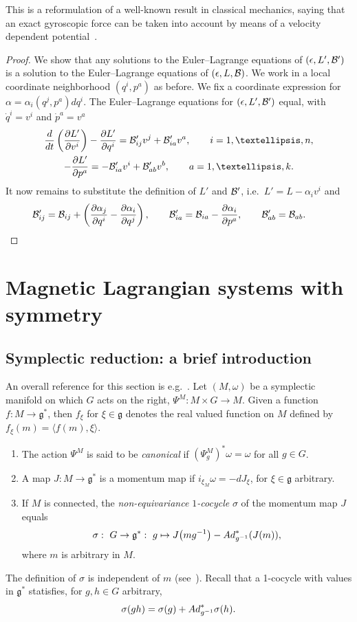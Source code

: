 \documentclass[11pt]{article}
\newcommand{\B}{{\cal B}}
\newcommand{\e}{\epsilon}
\newcommand{\lag}{\mathfrak{g}}
\def\fpd#1#2{\frac{\partial #1}{\partial #2}}
\begin{document}
This is a reformulation of a well-known result in classical mechanics, saying that an exact gyroscopic force can be taken into account by means of a velocity dependent potential~\cite{pars}.
\begin{proof}
We show that any solutions to the Euler--Lagrange equations of $(\e, L',\B ')$ is a solution to the Euler--Lagrange equations of $(\e,L,\B)$. We work in a local coordinate neighborhood $(q^i,p^a)$ as before. We f\/ix a coordinate expression for $\alpha=\alpha_i(q^j,p^a)dq^i$. The Euler--Lagrange equations for $(\e,L',\B')$ equal, with $\dot q^i= v^i$ and $\dot p^a= v^a$
\begin{gather*}
\frac{d}{dt}\left(\fpd{L'}{v^i}\right) -\fpd{L'}{q^i}=\B'_{ij}v^j + \B'_{ia} v^a,\qquad i=1,\ldots,n,\\
  -\fpd{L'}{p^a}=-\B'_{ia}v^i + \B'_{ab} v^b,\qquad a=1,\ldots,k.
\end{gather*}
It now remains to substitute the def\/inition of $L'$ and $\B'$, i.e.\ $L'= L - \alpha_i v^i$ and
\begin{gather*}
\B'_{ij} = \B_{ij} + \left(\fpd{\alpha_j}{q^i}-\fpd{\alpha_i}{q^j}\right), \qquad \B'_{ia} = \B_{ia} - \fpd{\alpha_i}{p^a}, \qquad \B'_{ab} = \B_{ab}. \tag*{\qed}
\end{gather*}
\renewcommand{\qed}{}\end{proof}


\section{Magnetic Lagrangian systems with symmetry}\label{section4}

\subsection{Symplectic reduction: a brief introduction}\label{section4.1}

An overall reference for this section is e.g.~\cite{MarsdenHamRed}. Let $(M,\omega)$ be a symplectic manifold on which $G$ acts on the right, $\Psi^M:M\times G\to M$. Given a function $f: M\to \lag^*$, then $f_\xi$ for $\xi\in\lag$ denotes the real valued function on $M$ def\/ined by $f_\xi(m)= \langle f(m),\xi\rangle$.
\begin{definition}\label{def:cocycle}\mbox{}
\begin{enumerate}\itemsep=0pt
\item The action $\Psi^M$  is said to be {\em canonical} if $(\Psi^M_g)^*\omega=\omega$ for all $g\in G$.
\item A map $J:M\to \lag^*$ is a momentum map if $i_{\xi_M}\omega=-dJ_\xi$, for $\xi \in\lag$ arbitrary.
\item If $M$ is connected, the {\em non-equivariance $1$-cocycle} $\sigma$ of the momentum map $J$ equals
\[
\sigma: \ G\to \lag^*: \ g\mapsto J\big(mg^{-1}\big)-{\rm Ad}^*_{g^{-1}}(J(m)),
\]
where $m$ is arbitrary in $M$.
\end{enumerate}\end{definition}
The def\/inition of $\sigma$ is independent of $m$ (see~\cite{Marsden}). Recall that a 1-cocycle with values in $\lag^*$ statisf\/ies, for $g,h\in G$ arbitrary,
\[
\sigma(gh)=\sigma(g)+ {\rm Ad}^*_{g^{-1}}\sigma(h).
\]
\end{document}
